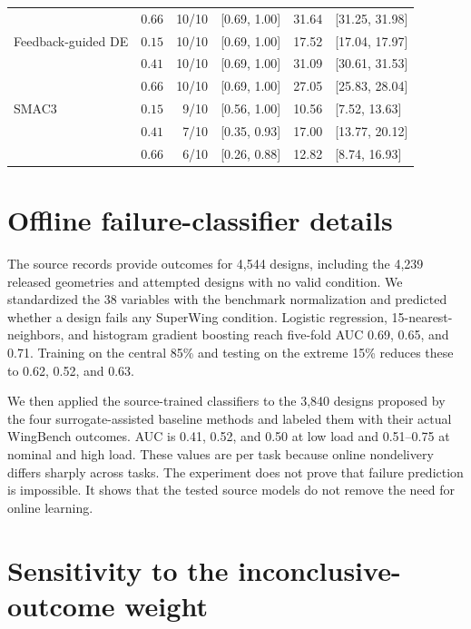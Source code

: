 \documentclass{article} %
\begin{document}
\begin{table}[h]
\begin{tabular*}{\textwidth}{@{\extracolsep{\fill}}llrlrl}
 & $0.66$ & 10/10 & [0.69, 1.00] & 31.64 & [31.25, 31.98] \\
Feedback-guided DE & $0.15$ & 10/10 & [0.69, 1.00] & 17.52 & [17.04, 17.97] \\
 & $0.41$ & 10/10 & [0.69, 1.00] & 31.09 & [30.61, 31.53] \\
 & $0.66$ & 10/10 & [0.69, 1.00] & 27.05 & [25.83, 28.04] \\
SMAC3 & $0.15$ & 9/10 & [0.56, 1.00] & 10.56 & [7.52, 13.63] \\
 & $0.41$ & 7/10 & [0.35, 0.93] & 17.00 & [13.77, 20.12] \\
 & $0.66$ & 6/10 & [0.26, 0.88] & 12.82 & [8.74, 16.93] \\
\bottomrule
\end{tabular*}
\end{table}

\section{Offline failure-classifier details}
\label{app:classifier}

The source records provide outcomes for 4{,}544 designs, including the 4{,}239
released geometries and attempted designs with no valid condition. We
standardized the 38 variables with the benchmark normalization and predicted
whether a design fails any SuperWing condition. Logistic regression,
15-nearest-neighbors, and histogram gradient boosting reach five-fold AUC
0.69, 0.65, and 0.71. Training on the central 85\% and testing on
the extreme 15\% reduces these to 0.62, 0.52, and 0.63.

We then applied the source-trained classifiers to the 3{,}840 designs proposed by
the four surrogate-assisted baseline methods and labeled them with their actual
WingBench outcomes. AUC is 0.41, 0.52, and 0.50 at low load and 0.51--0.75 at
nominal and high load. These values are per task because online
nondelivery differs sharply across tasks. The experiment does not prove that
failure prediction is impossible. It shows that the tested source models do not
remove the need for online learning.

\section{Sensitivity to the inconclusive-outcome weight}
\label{app:weight}
\end{document}
